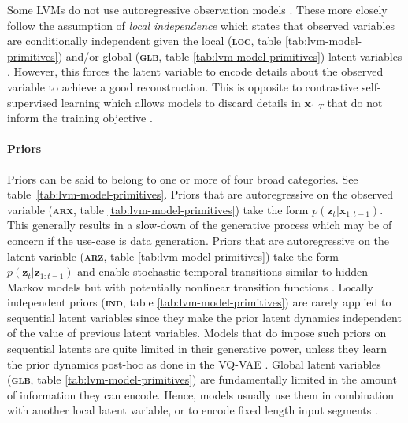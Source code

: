 Some LVMs do not use autoregressive observation models \cite{ebbers_hidden_2017, glarner_full_2018, hsu_unsupervised_2017, hsu_learning_2017, khurana_factorial_2019, khurana_convolutional_2020}. These more closely follow the assumption of \emph{local independence} which states that observed variables are conditionally independent given the local (\textbf{\textsc{loc}}, table \ref{tab:lvm-model-primitives}) and/or global (\textbf{\textsc{glb}}, table \ref{tab:lvm-model-primitives}) latent variables \cite{bartholomew_latent_2011}. 
However, this forces the latent variable to encode details about the observed variable to achieve a good reconstruction. This is opposite to contrastive self-supervised learning which allows models to discard details in $\mathbf{x}_{1:T}$ that do not inform the training objective \cite{baevski2020wav2vec}.



\paragraph{Priors}
Priors can be said to belong to one or more of four broad categories. See table~\ref{tab:lvm-model-primitives}. 
Priors that are autoregressive on the observed variable (\textbf{\textsc{arx}}, table \ref{tab:lvm-model-primitives}) take the form $p(\mathbf{z}_t|\mathbf{x}_{1:t-1})$. This generally results in a slow-down of the generative process which may be of concern if the use-case is data generation. %
Priors that are autoregressive on the latent variable (\textbf{\textsc{arz}}, table \ref{tab:lvm-model-primitives}) take the form $p(\mathbf{z}_t|\mathbf{z}_{1:t-1})$ and enable stochastic temporal transitions similar to hidden Markov models but with potentially nonlinear transition functions \cite{chung_recurrent_2015, fraccaro_sequential_2016, khurana_factorial_2019, khurana_convolutional_2020}.
Locally independent priors (\textbf{\textsc{ind}}, table \ref{tab:lvm-model-primitives}) are rarely applied to sequential latent variables since they make the prior latent dynamics independent of the value of previous latent variables. Models that do impose such priors on sequential latents are quite limited in their generative power, unless they learn the prior dynamics post-hoc as done in the VQ-VAE \cite{oord_neural_2018}. 
Global latent variables (\textbf{\textsc{glb}}, table \ref{tab:lvm-model-primitives}) are fundamentally limited in the amount of information they can encode. Hence, models usually use them in combination with another local latent variable, or to encode fixed length input segments \cite{khurana_factorial_2019, hsu_learning_2017, hsu_unsupervised_2017}.

